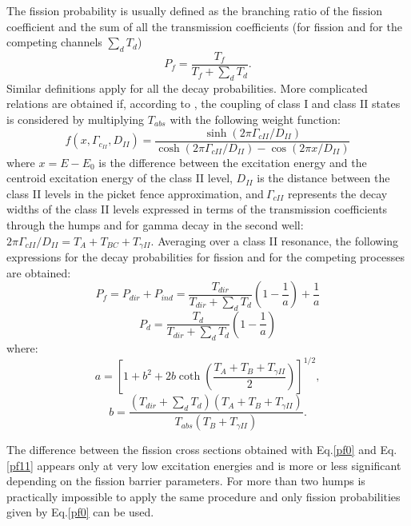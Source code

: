 \documentclass[twocolumn,amsmath,amssymb,10pt,groupedaddress,a4paper]{revtex4}
\begin{document}
The fission probability is usually defined as the branching ratio of the fission coefficient
and the sum of all the transmission coefficients (for fission and for the competing channels
$\sum_dT_d$)
%
\begin{equation}
P_{f}=\frac{T_{f}}{T_{f}+\sum_{d}T_{d}}.
\label{pf0}%
\end{equation}
%
Similar definitions apply for all the decay probabilities.
More complicated relations are obtained if, according to \cite{Back:74},
the coupling of class I and class II states is considered by multiplying $T_{abs}$ with the
following weight function:%
%
\begin{equation}
f(x,\Gamma_{c_{II}},D_{II})=\frac{\sinh(2\pi\Gamma_{cII}/D_{II})}{\cosh
(2\pi\Gamma_{cII}/D_{II})-\cos(2\pi x/D_{II})}%
\end{equation}
%
where $x=E-E_{0}$ is the difference between the excitation energy and the
centroid excitation energy of the class II level, $D_{II}$ is the distance
between the class II levels in the picket fence approximation, and$\ \Gamma
_{cII}$ represents the decay widths of the class II levels expressed in terms
of the transmission coefficients through the humps and for gamma decay in the
second well:\ $2\pi\Gamma_{cII}/D_{II}=T_{A}+T_{BC}+T_{\gamma II}.$
Averaging over a class II resonance, the following expressions for the decay
probabilities for fission and for the competing processes
are obtained:%
%
\begin{equation}
P_{f}=P_{dir}+P_{ind}=\frac{T_{dir}}{T_{dir}+\sum_{d}T_{d}}\left(  1-\frac
{1}{a}\right)  +\frac{1}{a}\label{pf11}%
\end{equation}
%
%
\begin{equation}
P_{d}=\frac{T_{d}}{T_{dir}+\sum_{d}T_{d}}\left(  1-\frac{1}{a}\right)  \label{pd}%
\end{equation}
%
where:
\begin{equation}
a=\left[  1+b^{2}+2b\coth\left(  \frac{T_{A}+T_{B}+T_{\gamma II}}{2}\right)
\right]  ^{1/2}, \label{a11}%
\end{equation}%
%
\begin{equation}
b=\frac{(T_{dir}+\sum_{d}T_{d})(T_{A}+T_{B}+T_{\gamma II})}{T_{abs}%
(T_{B}+T_{\gamma II})}. \label{b11}%
\end{equation}
%

The difference between the fission cross sections obtained with Eq.\ref{pf0} and
Eq.\ref{pf11} appears only at very low excitation energies and is more or less significant
depending on the fission barrier parameters. For more than two humps is practically
impossible to apply the same procedure and only fission probabilities given by Eq.\ref{pf0}
can be used.
\end{document}
